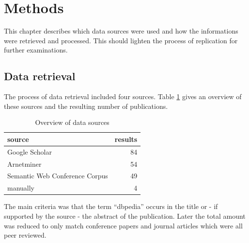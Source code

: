 \documentclass[english]{lni}
\begin{document}
\section{Methods}
\label{sec-2}

  This chapter describes which data sources were used and how the informations
  were retrieved and processed. This should lighten the process of replication
  for further examinations.
\subsection{Data retrieval}
\label{sec-2-1}

   The process of data retrieval included four sources. Table
   \ref{tab:datenquellen} gives an overview of these sources and the resulting
   number of publications.
\begin{table}[htb]
\caption{Overview of data sources} \label{tab:datenquellen}
\begin{center}
\begin{tabular}{lr}
\hline
 source                          &  results  \\
\hline
 Google Scholar                  &       84  \\
 Arnetminer                      &       54  \\
 Semantic Web Conference Corpus  &       49  \\
 manually                        &        4  \\
\hline
\end{tabular}
\end{center}
\end{table}

   The main criteria was that the term ``dbpedia'' occurs in the title
   or - if supported by the source - the abstract of the
   publication. Later the total amount was reduced to only match
   conference papers and journal articles which were all peer
   reviewed.
\end{document}
